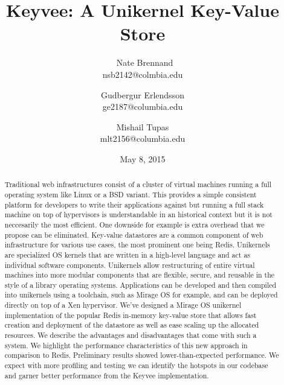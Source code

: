 \documentclass[english,10pt,twocolumn]{article}
\begin{document}
\title{Keyvee: A Unikernel Key-Value Store}
\author{\
Nate Brennand\\nsb2142@colmbia.edu
\and
Gudbergur Erlendsson\\ge2187@columbia.edu
\and
Mishail Tupas\\mlt2156@columbia.edu}
\date{May 8, 2015}
\maketitle
\thispagestyle{empty}


\begin{abstract}
Traditional web infrastructures consist of a cluster of virtual machines running a full operating system like Linux or a BSD variant.
This provides a simple consistent platform for developers to write their applications against but running a full stack machine on top of hypervisors is understandable in an historical context but it is not neccesarily the most efficient.
One downside for example is extra overhead that we propose can be eliminated.
Key-value datastores are a common component of web infrastructure for various use cases, the most prominent one being Redis.
Unikernels are specialized OS kernels that are written in a high-level language and act as individual software components.
Unikernels allow restructuring of entire virtual machines into more modular components that are flexible, secure, and reusable in the style of a library operating systems.
Applications can be developed and then compiled into unikernels using a toolchain, such as Mirage OS for example, and can be deployed directly on top of a Xen hypervisor.
We've designed a Mirage OS\cite{mirage} unikernel implementation of the popular Redis\cite{redis} in-memory key-value store that allows fast creation and deployment of the datastore as well as ease scaling up the allocated resources.
We describe the advantages and disadvantages that come with such a system.
We highlight the performance characteristics of this new approach in comparison to Redis.
Preliminary results showed lower-than-expected performance.
We expect with more profiling and testing we can identify the hotspots in our codebase and garner better performance from the Keyvee implementation.
\end{abstract}
\end{document}
